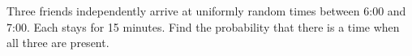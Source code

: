Three friends independently arrive at uniformly random times between 6:00 and 7:00. Each stays for 15 minutes. Find the probability that there is a time when all three are present.
